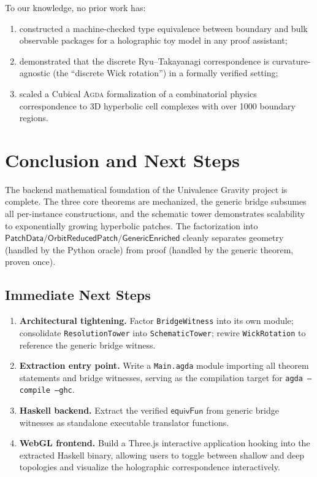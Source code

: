 \documentclass[11pt, a4paper]{article}
\theoremstyle{plain}
\theoremstyle{definition}
\newcommand{\Agda}{\textsc{Agda}}
\newcommand{\RT}{Ryu--Takayanagi}
\newcommand{\PD}{\mathsf{PatchData}}
\newcommand{\ORP}{\mathsf{OrbitReducedPatch}}
\begin{document}
To our knowledge, no prior work has:
\begin{enumerate}[nosep]
  \item constructed a machine-checked type equivalence between
    boundary and bulk observable packages for a holographic toy
    model in any proof assistant;
  \item demonstrated that the discrete \RT{} correspondence is
    curvature-agnostic (the ``discrete Wick rotation'') in a
    formally verified setting;
  \item scaled a Cubical \Agda{} formalization of a combinatorial
    physics correspondence to 3D hyperbolic cell complexes with
    over 1000 boundary regions.
\end{enumerate}

\section{Conclusion and Next Steps}
\label{sec:conclusion}

The backend mathematical foundation of the Univalence Gravity
project is complete.  The three core theorems are mechanized, the
generic bridge subsumes all per-instance constructions, and the
schematic tower demonstrates scalability to exponentially growing
hyperbolic patches.  The factorization into
$\PD / \ORP / \mathsf{GenericEnriched}$ cleanly separates geometry
(handled by the Python oracle) from proof (handled by the generic
theorem, proven once).

\subsection{Immediate Next Steps}

\begin{enumerate}[nosep]
  \item \textbf{Architectural tightening.} Factor
    \texttt{BridgeWitness} into its own module; consolidate
    \texttt{ResolutionTower} into \texttt{SchematicTower}; rewire
    \texttt{WickRotation} to reference the generic bridge witness.
  \item \textbf{Extraction entry point.} Write a \texttt{Main.agda}
    module importing all theorem statements and bridge witnesses,
    serving as the compilation target for
    \texttt{agda --compile --ghc}.
  \item \textbf{Haskell backend.} Extract the verified
    $\mathsf{equivFun}$ from generic bridge witnesses as
    standalone executable translator functions.
  \item \textbf{WebGL frontend.} Build a Three.js interactive
    application hooking into the extracted Haskell binary, allowing
    users to toggle between shallow and deep topologies and
    visualize the holographic correspondence interactively.
\end{enumerate}
\end{document}
